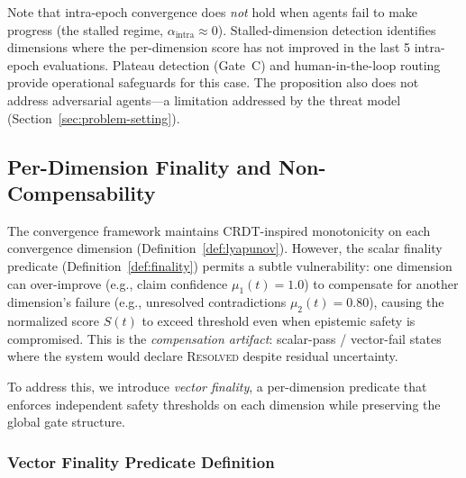 \documentclass[11pt]{article}
\begin{document}
Note that intra-epoch convergence does \emph{not} hold when agents fail to make progress (the stalled regime, $\alpha_{\text{intra}} \approx 0$). Stalled-dimension detection identifies dimensions where the per-dimension score has not improved in the last 5 intra-epoch evaluations. Plateau detection (Gate~C) and human-in-the-loop routing provide operational safeguards for this case. The proposition also does not address adversarial agents---a limitation addressed by the threat model (Section~\ref{sec:problem-setting}).

\subsection{Per-Dimension Finality and Non-Compensability}
\label{sec:vector-finality}

The convergence framework maintains CRDT-inspired monotonicity on each convergence dimension
(Definition~\ref{def:lyapunov}). However, the scalar finality predicate (Definition~\ref{def:finality})
permits a subtle vulnerability: one dimension can over-improve (e.g., claim confidence $\mu_1(t) = 1.0$)
to compensate for another dimension's failure (e.g., unresolved contradictions $\mu_2(t) = 0.80$),
causing the normalized score $S(t)$ to exceed threshold even when epistemic safety is compromised.
This is the \emph{compensation artifact}: scalar-pass / vector-fail states where the system would
declare \textnormal{\textsc{Resolved}} despite residual uncertainty.

To address this, we introduce \emph{vector finality}, a per-dimension predicate that enforces
independent safety thresholds on each dimension while preserving the global gate structure.

\subsubsection{Vector Finality Predicate Definition}
\end{document}
